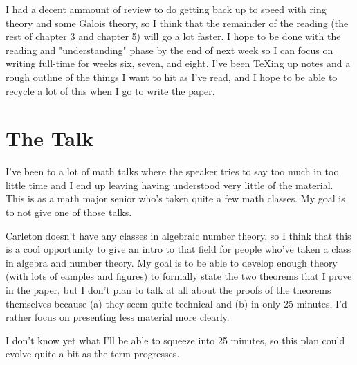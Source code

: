 \documentclass{ali-hw}
\begin{document}
I had a decent ammount of review to do getting back up to speed with ring theory and some Galois theory, so I think that the remainder of the reading (the rest of chapter 3 and chapter 5) will go a lot faster. I hope to be done with the reading and "understanding" phase by the end of next week so I can focus on writing full-time for weeks six, seven, and eight. I've been \TeX{}ing up notes and a rough outline of the things I want to hit as I've read, and I hope to be able to recycle a lot of this when I go to write the paper.

\section{The Talk}

I've been to a lot of math talks where the speaker tries to say too much in too little time and I end up leaving having understood very little of the material. This is as a math major senior who's taken quite a few math classes. My goal is to not give one of those talks.

Carleton doesn't have any classes in algebraic number theory, so I think that this is a cool opportunity to give an intro to that field for people who've taken a class in algebra and number theory. My goal is to be able to develop enough theory (with lots of eamples and figures) to formally state the two theorems that I prove in the paper, but I don't plan to talk at all about the proofs of the theorems themselves because (a) they seem quite technical and (b) in only 25 minutes, I'd rather focus on presenting less material more clearly.

I don't know yet what I'll be able to squeeze into 25 minutes, so this plan could evolve quite a bit as the term progresses.
\end{document}
